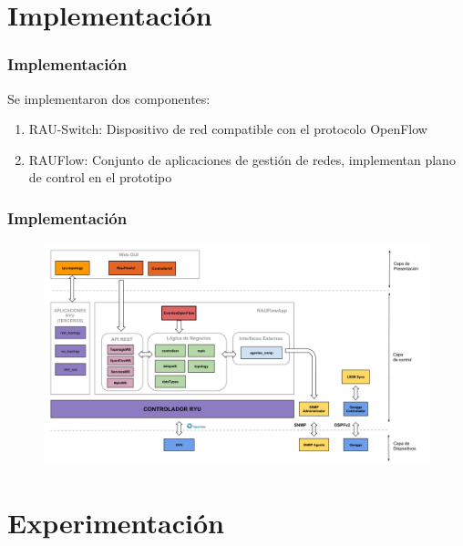 \documentclass{beamer}
\begin{document}

\section{Implementaci\'on} 

\begin{frame}
\frametitle{Implementaci\'on} 

Se implementaron dos componentes:

\begin{enumerate}
\item RAU-Switch: Dispositivo de red compatible con el protocolo OpenFlow
\item RAUFlow: Conjunto de aplicaciones de gesti\'on de redes, implementan plano de control en el prototipo
\end{enumerate}
\end{frame}

\begin{frame}
\frametitle{Implementaci\'on} 

\begin{figure}[H]
\centering
\includegraphics[width=1.0\textwidth]{imagenes/rauflowarquitectura.png}
\end{figure}

\end{frame}

\section{Experimentaci\'on} 
\end{document}
